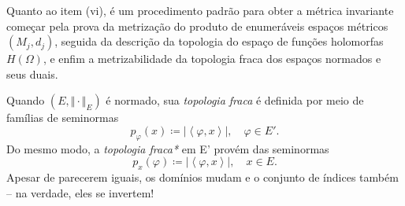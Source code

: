 \documentclass[../distribution_theory_notes.tex]{subfiles}
\begin{document}
  \begin{tcolorbox}[
  skin=enhanced,
  title=Observação,
  fonttitle=\bfseries,
colframe=black,
  colbacktitle=cyan!75!white, 
  colback=cyan!15,
  colbacklower=black,
coltitle=black,
  drop fuzzy shadow,
  ]
  Quanto ao item (vi), é um procedimento padrão para obter a métrica invariante começar pela prova da metrização do produto de enumeráveis espaços métricos \((M_{j}, d_{j})\), seguida da descrição da topologia do espaço de funções holomorfas \(H(\Omega )\), e enfim a metrizabilidade da topologia fraca dos espaços normados e seus duais. 
  \end{tcolorbox}

\begin{example}
  Quando \((E, \Vert \cdot  \Vert_{E})\) é normado, sua \textit{topologia fraca} é definida por meio de famílias de seminormas 
    \[
      p_{\varphi }(x)\coloneqq |\left< \varphi , x \right>|,\quad \varphi \in E'.
    \]
    Do mesmo modo, a \textit{topologia fraca*} em E' provém das seminormas 
      \[
        p_{x}(\varphi )\coloneqq |\left< \varphi , x \right>|,\quad x\in E.
      \]
      Apesar de parecerem iguais, os domínios mudam e o conjunto de índices também -- na verdade, eles se invertem!
\end{example}
\end{document}
